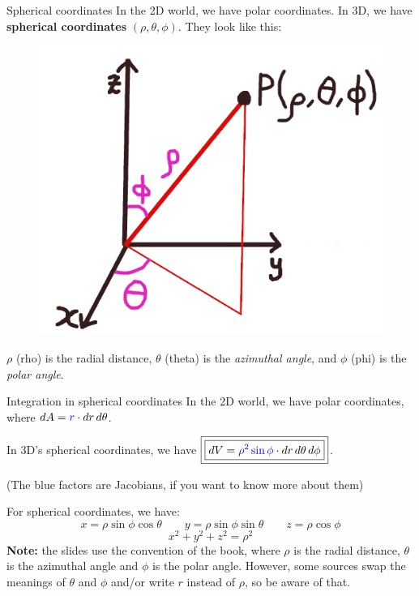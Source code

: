 \begin{frame}{Spherical coordinates}
    In the 2D world, we have polar coordinates. In 3D, we have \textbf{spherical coordinates} $(\rho,\theta,\phi)$.
    They look like this:
    \begin{figure}[b]\includegraphics[scale=1.3]{sph}\centering\end{figure}
        $\rho$ (rho) is the radial distance, $\theta$ (theta) is the \textit{azimuthal angle}, and $\phi$ (phi) is the \textit{polar angle}.
\end{frame}

\begin{frame}{Integration in spherical coordinates}
    In the 2D world, we have polar coordinates, where $dA=\textcolor{blue}{r}\cdot dr\,d\theta$.

    In 3D's spherical coordinates, we have $\boxed{\boxed{dV=\textcolor{blue}{\rho^2\sin\phi}\cdot dr\,d\theta \,d\phi}}$.

    {\scriptsize(The blue factors are Jacobians, if you want to know more about them)}

    For spherical coordinates, we have:
        \[\boxed{x=\rho\sin\phi\cos\theta \qquad y=\rho\sin\phi\sin\theta \qquad z=\rho\cos\phi}\]
        \[\boxed{x^2+y^2+z^2=\rho^2}\]
    \textbf{Note:} the slides use the convention of the book, where $\rho$ is the radial distance, $\theta$ is the azimuthal angle and $\phi$ is the polar angle. However, some sources swap the meanings of $\theta$ and $\phi$ and/or write $r$ instead of $\rho$, so be aware of that.
\end{frame}

